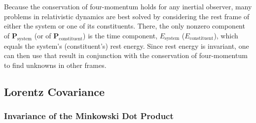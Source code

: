 \documentclass[12pt]{article}
\renewcommand{\vv}[1]{\mathbf{#1}}
\begin{document}
Because the conservation of four-momentum holds for any inertial observer, many problems in relativistic dynamics are best solved by considering the rest frame of either the system or one of its constituents. There, the only nonzero component of $\vv P_{\mathrm{system}}$ (or of $\vv P_{\mathrm{constituent}}$) is the time component, $E_{\mathrm{system}}$ ($E_{\mathrm{constituent}}$), which equals the system's (constituent's) rest energy. Since rest energy is invariant, one can then use that result in conjunction with the conservation of four-momentum to find unknowns in other frames.


\subsection{Lorentz Covariance}

\subsubsection{Invariance of the Minkowski Dot Product}
\end{document}
